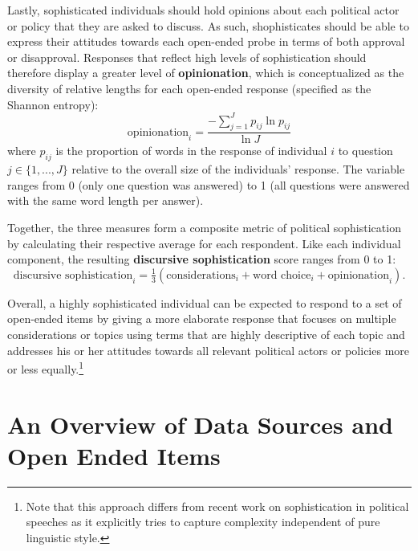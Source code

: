 \documentclass[12pt]{article}
\begin{document}
Lastly, sophisticated individuals should hold opinions about each political actor or policy that they are asked to discuss. As such, shophisticates should be able to express their attitudes towards each open-ended probe in terms of both approval or disapproval. Responses that reflect high levels of sophistication should therefore display a greater level of \textbf{opinionation}, which is conceptualized as the diversity of relative lengths for each open-ended response (specified as the Shannon entropy):
\begin{equation}
\text{opinionation}_i = \dfrac{-\sum_{j=1}^J p_{ij} \ln p_{ij}}{\ln J}
\end{equation}
where $p_{ij}$ is the proportion of words in the response of individual $i$ to question $j\in \{1,...,J\}$ relative to the overall size of the individuals' response. The variable ranges from 0 (only one question was answered) to 1 (all questions were answered with the same word length per answer).

Together, the three measures form a composite metric of political sophistication by calculating their respective average for each respondent. Like each individual component, the resulting \textbf{discursive sophistication} score ranges from 0 to 1:
\begin{equation}
\text{discursive sophistication}_i = \tfrac{1}{3}(\text{considerations}_i + \text{word choice}_i + \text{opinionation}_i).
\end{equation}

Overall, a highly sophisticated individual can be expected to respond to a set of open-ended items by giving a more elaborate response that focuses on multiple considerations or topics using terms that are highly descriptive of each topic and addresses his or her attitudes towards all relevant political actors or policies more or less equally.\footnote{Note that this approach differs from recent work on sophistication in political speeches \citep[e.g.,][]{spirling2016democratization} as it explicitly tries to capture complexity independent of pure linguistic style.}





\section*{An Overview of Data Sources and Open Ended Items}
\end{document}

